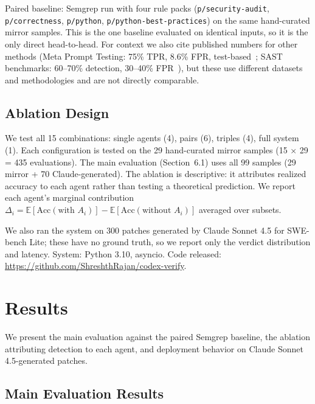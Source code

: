 \documentclass[10pt,twocolumn]{article}
\begin{document}
Paired baseline: Semgrep run with four rule packs (\texttt{p/security-audit}, \texttt{p/correctness}, \texttt{p/python}, \texttt{p/python-best-practices}) on the same hand-curated mirror samples. This is the one baseline evaluated on identical inputs, so it is the only direct head-to-head. For context we also cite published numbers for other methods (Meta Prompt Testing: 75\% TPR, 8.6\% FPR, test-based~\cite{wang2024metamorphic}; SAST benchmarks: 60--70\% detection, 30--40\% FPR~\cite{johnson2024sast, owasp2024}), but these use different datasets and methodologies and are not directly comparable.

\subsection{Ablation Design}

We test all 15 combinations: single agents (4), pairs (6), triples (4), full system (1). Each configuration is tested on the 29 hand-curated mirror samples (15 × 29 = 435 evaluations). The main evaluation (Section~6.1) uses all 99 samples (29 mirror + 70 Claude-generated). The ablation is descriptive: it attributes realized accuracy to each agent rather than testing a theoretical prediction. We report each agent's marginal contribution $\Delta_i = \mathbb{E}[\text{Acc}(\text{with } A_i)] - \mathbb{E}[\text{Acc}(\text{without } A_i)]$ averaged over subsets.

We also ran the system on 300 patches generated by Claude Sonnet 4.5 for SWE-bench Lite; these have no ground truth, so we report only the verdict distribution and latency. System: Python 3.10, asyncio. Code released: \url{https://github.com/ShreshthRajan/codex-verify}.


\section{Results}

We present the main evaluation against the paired Semgrep baseline, the ablation attributing detection to each agent, and deployment behavior on Claude Sonnet 4.5-generated patches.

\subsection{Main Evaluation Results}
\end{document}

